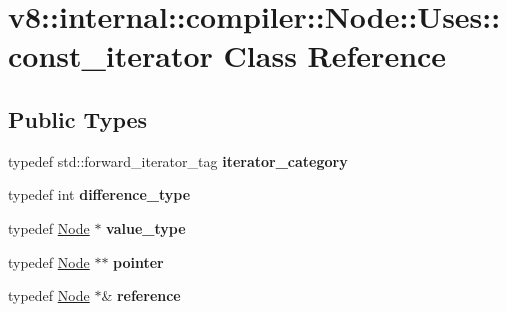 \hypertarget{classv8_1_1internal_1_1compiler_1_1_node_1_1_uses_1_1const__iterator}{}\section{v8\+:\+:internal\+:\+:compiler\+:\+:Node\+:\+:Uses\+:\+:const\+\_\+iterator Class Reference}
\label{classv8_1_1internal_1_1compiler_1_1_node_1_1_uses_1_1const__iterator}
\subsection*{Public Types}
\begin{DoxyCompactItemize}
\item 
typedef std\+::forward\+\_\+iterator\+\_\+tag {\bfseries iterator\+\_\+category}\hypertarget{classv8_1_1internal_1_1compiler_1_1_node_1_1_uses_1_1const__iterator_a547082e47066856751da8e1d7fcde376}{}\label{classv8_1_1internal_1_1compiler_1_1_node_1_1_uses_1_1const__iterator_a547082e47066856751da8e1d7fcde376}

\item 
typedef int {\bfseries difference\+\_\+type}\hypertarget{classv8_1_1internal_1_1compiler_1_1_node_1_1_uses_1_1const__iterator_a90a9134ba510c5a877c48a172b4a8ae6}{}\label{classv8_1_1internal_1_1compiler_1_1_node_1_1_uses_1_1const__iterator_a90a9134ba510c5a877c48a172b4a8ae6}

\item 
typedef \hyperlink{classv8_1_1internal_1_1compiler_1_1_node}{Node} $\ast$ {\bfseries value\+\_\+type}\hypertarget{classv8_1_1internal_1_1compiler_1_1_node_1_1_uses_1_1const__iterator_ae0631a3a013263b68fa9f8b16e9625f2}{}\label{classv8_1_1internal_1_1compiler_1_1_node_1_1_uses_1_1const__iterator_ae0631a3a013263b68fa9f8b16e9625f2}

\item 
typedef \hyperlink{classv8_1_1internal_1_1compiler_1_1_node}{Node} $\ast$$\ast$ {\bfseries pointer}\hypertarget{classv8_1_1internal_1_1compiler_1_1_node_1_1_uses_1_1const__iterator_af77095de352cf3f36dea1dc4ad2b3842}{}\label{classv8_1_1internal_1_1compiler_1_1_node_1_1_uses_1_1const__iterator_af77095de352cf3f36dea1dc4ad2b3842}

\item 
typedef \hyperlink{classv8_1_1internal_1_1compiler_1_1_node}{Node} $\ast$\& {\bfseries reference}\hypertarget{classv8_1_1internal_1_1compiler_1_1_node_1_1_uses_1_1const__iterator_ac2ef99c152567762c0f9837a26822dc0}{}\label{classv8_1_1internal_1_1compiler_1_1_node_1_1_uses_1_1const__iterator_ac2ef99c152567762c0f9837a26822dc0}

\end{DoxyCompactItemize}
